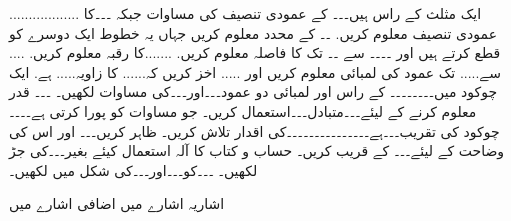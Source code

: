.................. ایک مثلث کے راس ہیں۔۔۔ کے عمودی تنصیف کی مساوات جبکہ ۔۔۔کا عمودی تنصیف معلوم کریں. ۔۔ کے محدد معلوم کریں جہاں یہ خطوط ایک دوسرے کو قطع کرتے ہیں اور  ۔۔۔۔ سے ۔۔ تک کا فاصلہ معلوم کریں. 
.......کا رقبہ معلوم کریں. .... سے.....  تک عمود کی لمبائی معلوم کریں اور ..... اخز کریں کہ......  کا زاویہ.....  ہے.
ایک چوکود میں۔۔۔۔۔۔۔۔ کے راس اور لمبائی دو عمود۔۔۔اور۔۔۔کی مساوات لکھیں۔
۔۔۔ قدر معلوم کرنے کے لیئے۔۔۔متبادل۔۔۔استعمال کریں۔ جو مساوات کو پورا کرتی ہے۔۔۔۔
چوکود کی تقریب۔۔۔ہے۔۔۔۔۔۔۔۔۔۔۔۔۔۔۔کی اقدار تلاش کریں۔
ظاہر کریں۔۔۔ اور اس کی وضاحت کے لیئے۔۔۔ کے قریب کریں۔ حساب و کتاب کا آلہ استعمال کیئے بغیر۔۔۔کی جڑ لکھیں۔
۔۔۔کو۔۔۔اور۔۔۔کی شکل میں لکھیں۔

اشاریہ اشارے میں
اضافی اشارے میں

